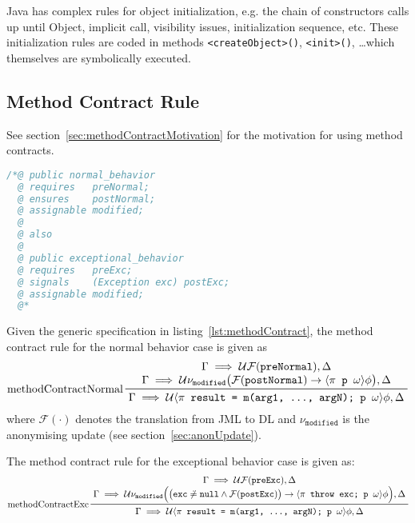 			Java has complex rules for object initialization, e.g. the chain of constructors calls up until Object, implicit  call, visibility issues, initialization sequence, etc. These initialization rules are coded in methods \texttt{<createObject>()}, \texttt{<init>()}, \dots which themselves are symbolically executed.

		\subsection{Method Contract Rule}
			\label{sec:methodContract}
			
			See section~\ref{sec:methodContractMotivation} for the motivation for using method contracts.
			
			\begin{lstlisting}[caption = { Method Contract Rule Specification Example }, label = lst:methodContract, language = Java]
/*@ public normal_behavior
  @ requires   preNormal;
  @ ensures    postNormal;
  @ assignable modified;
  @
  @ also
  @
  @ public exceptional_behavior
  @ requires   preExc;
  @ signals    (Exception exc) postExc;
  @ assignable modified;
  @*
			\end{lstlisting}
			
			Given the generic specification in listing~\ref{lst:methodContract}, the method contract rule for the normal behavior case is given as
			\begin{equation*}
				\prftree[l]
					{methodContractNormal}
					{\let\scriptstyle\textstyle \substack{
					 \Gamma \implies \mathcal{U} \mathcal{F}(\texttt{preNormal}), \Delta \\
					 \Gamma \implies \mathcal{U} \nu_\texttt{modified} \big( \mathcal{F}(\texttt{postNormal}) \to \langle \pi \texttt{ p } \omega \rangle \phi \big), \Delta}}
					{\Gamma \implies \mathcal{U} \langle \pi \texttt{ result = m(arg1, ..., argN); p } \omega \rangle \phi, \Delta}
			\end{equation*}
			where \( \mathcal{F}(\cdot) \) denotes the translation from JML to DL and \( \nu_\texttt{modified} \) is the anonymising update (see section~\ref{sec:anonUpdate}).
			
			The method contract rule for the exceptional behavior case is given as:
			\begin{equation*}
				\prftree[l]
					{methodContractExc}
					{\let\scriptstyle\textstyle \substack{
					 \Gamma \implies \mathcal{U} \mathcal{F}(\texttt{preExc}), \Delta \\
				     \Gamma \implies \mathcal{U} \nu_\texttt{modified} \Big( \big( \texttt{exc} \not\doteq \texttt{null} \land \mathcal{F}(\texttt{postExc}) \big) \to \langle \pi \texttt{ throw exc; p } \omega \rangle \phi \Big), \Delta}}
					{\Gamma \implies \mathcal{U} \langle \pi \texttt{ result = m(arg1, ..., argN); p } \omega \rangle \phi, \Delta}
			\end{equation*}
			
